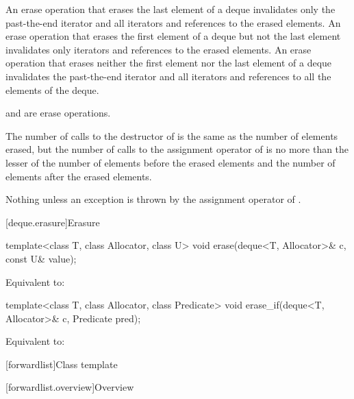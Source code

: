 \begin{itemdescr}
\pnum
\effects
An erase operation that erases the last element of a deque invalidates only the past-the-end iterator
and all iterators and references to the erased elements. An erase operation that erases the first
element of a deque but not the last element invalidates only iterators
and references to the erased elements. An erase operation
that erases neither the first element nor the last element of a deque invalidates the past-the-end
iterator and all iterators and references to all the elements of the deque.
\begin{note}
 and  are erase operations.
\end{note}

\pnum
\complexity
The number of calls to the destructor of  is the same as the
number of elements erased, but the number of calls to the assignment operator of  is
no more than the lesser of the number of elements before the erased elements and the number of elements after the erased elements.

\pnum
\throws
Nothing unless an exception is thrown by the assignment operator of
.
\end{itemdescr}

[deque.erasure]{Erasure}

%
\begin{itemdecl}
template<class T, class Allocator, class U>
  void erase(deque<T, Allocator>& c, const U& value);
\end{itemdecl}

\begin{itemdescr}
\pnum
\effects
Equivalent to: 
\end{itemdescr}

%
\begin{itemdecl}
template<class T, class Allocator, class Predicate>
  void erase_if(deque<T, Allocator>& c, Predicate pred);
\end{itemdecl}

\begin{itemdescr}
\pnum
\effects
Equivalent to: 
\end{itemdescr}

[forwardlist]{Class template }

[forwardlist.overview]{Overview}

